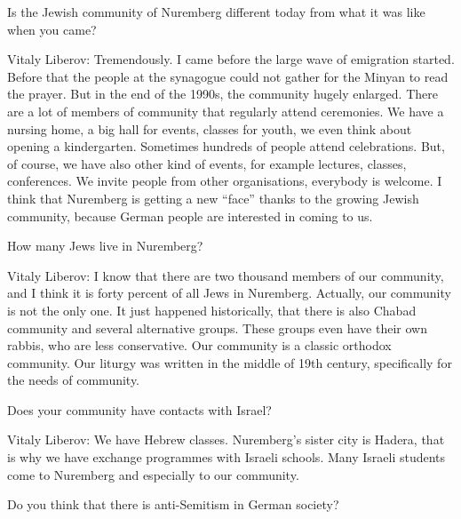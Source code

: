 Is the Jewish community of Nuremberg different today from what it was like when you came? 

Vitaly Liberov: Tremendously. I came before the large wave of emigration started. Before that the people at the synagogue could not gather for the Minyan to read the prayer. But in the end of the 1990s, the community hugely enlarged. There are a lot of members of community that regularly attend ceremonies. We have a nursing home, a big hall for events, classes for youth, we even think about opening a kindergarten. Sometimes hundreds of people attend celebrations.  But, of course, we have also other kind of events, for example lectures, classes, conferences. We invite people from other organisations, everybody is welcome. I think that Nuremberg is getting a new “face” thanks to the growing Jewish community, because German people are interested in coming to us.    

How many Jews live in Nuremberg? 

Vitaly Liberov: I know that there are two thousand members of our community, and I think it is forty percent of all Jews in Nuremberg. Actually, our community is not the only one. It just happened historically, that there is also Chabad community and several alternative groups. These groups even have their own rabbis, who are less conservative. Our community is a classic orthodox community. 
Our liturgy was written in the middle of 19th century, specifically for the needs of community.   

Does your community have contacts with Israel? 

Vitaly Liberov: We have Hebrew classes. Nuremberg’s sister city is Hadera, that is why we have exchange programmes with Israeli schools. Many Israeli students come to Nuremberg and especially to our community. 

Do you think that there is anti-Semitism in German society? 

